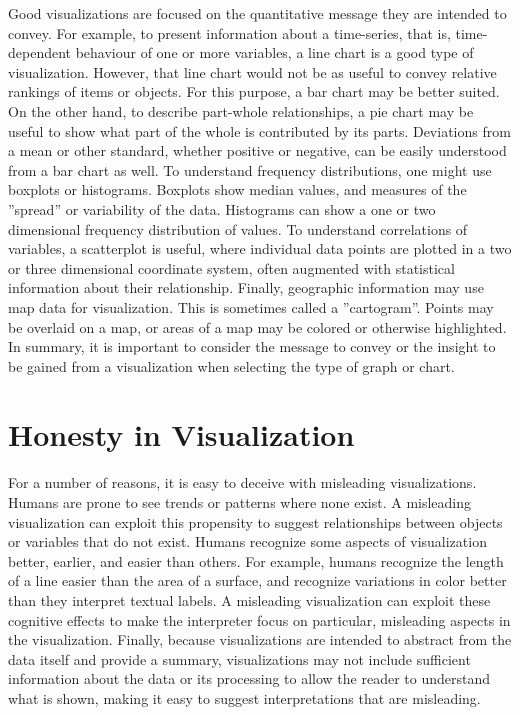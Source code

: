 Good visualizations are focused on the quantitative message they are intended to convey. For example, to present information about a time-series, that is, time-dependent behaviour of one or more variables, a line chart is a good type of visualization. However, that line chart would not be as useful to convey relative rankings of items or objects. For this purpose, a bar chart may be better suited. On the other hand, to describe part-whole relationships, a pie chart may be useful to show what part of the whole is contributed by its parts. Deviations from a mean or other standard, whether positive or negative, can be easily understood from a bar chart as well. To understand frequency distributions, one might use boxplots or histograms. Boxplots show median values, and measures of the ''spread'' or variability of the data. Histograms can show a one or two dimensional frequency distribution of values. To understand correlations of variables, a scatterplot is useful, where individual data points are plotted in a two or three dimensional coordinate system, often augmented with statistical information about their relationship. Finally, geographic information may use map data for visualization. This is sometimes called a ''cartogram''. Points may be overlaid on a map, or areas of a map may be colored or otherwise highlighted. In summary, it is important to consider the message to convey or the insight to be gained from a visualization when selecting the type of graph or chart.

\section{Honesty in Visualization}

For a number of reasons, it is easy to deceive with misleading visualizations. Humans are prone to see trends or patterns where none exist. A misleading visualization can exploit this propensity to suggest relationships between objects or variables that do not exist. Humans recognize some aspects of visualization better, earlier, and easier than others. For example, humans recognize the length of a line easier than the area of a surface, and recognize variations in color better than they interpret textual labels. A misleading visualization can exploit these cognitive effects to make the interpreter focus on particular, misleading aspects in the visualization. Finally, because visualizations are intended to abstract from the data itself and provide a summary, visualizations may not include sufficient information about the data or its processing to allow the reader to understand what is shown, making it easy to suggest interpretations that are misleading.

